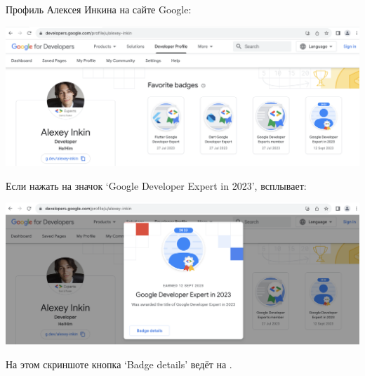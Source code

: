 
Профиль Алексея Инкина на сайте Google:

\includegraphics[width=\textwidth]{badge-awarded-1}

\VerticalSpace

Если нажать на значок `Google Developer Expert in 2023', всплывает:

\includegraphics[width=\textwidth]{badge-awarded-2}

\VerticalSpace

На этом скриншоте кнопка `Badge details' ведёт на .

\pagebreak

